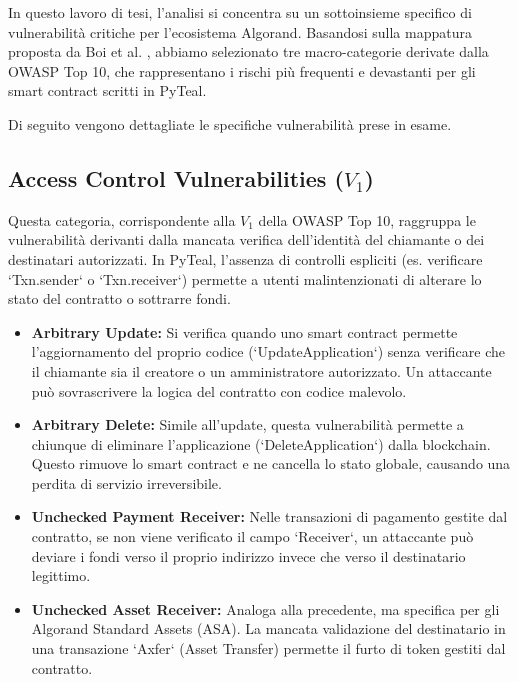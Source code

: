 In questo lavoro di tesi, l'analisi si concentra su un sottoinsieme specifico di vulnerabilità critiche per l'ecosistema Algorand. Basandosi sulla mappatura proposta da Boi et al. \cite{boi2025}, abbiamo selezionato tre macro-categorie derivate dalla OWASP Top 10, che rappresentano i rischi più frequenti e devastanti per gli smart contract scritti in PyTeal.

Di seguito vengono dettagliate le specifiche vulnerabilità prese in esame.

\subsection{Access Control Vulnerabilities (\texorpdfstring{$V_1$}{V1})}
Questa categoria, corrispondente alla $V_1$ \cite{boi2025} della OWASP Top 10, raggruppa le vulnerabilità derivanti dalla mancata verifica dell'identità del chiamante o dei destinatari autorizzati. In PyTeal, l'assenza di controlli espliciti (es. verificare `Txn.sender` o  `Txn.receiver`) permette a utenti malintenzionati di alterare lo stato del contratto o sottrarre fondi.

\begin{itemize}
    \item \textbf{Arbitrary Update:} Si verifica quando uno smart contract permette l'aggiornamento del proprio codice (`UpdateApplication`) senza verificare che il chiamante sia il creatore o un amministratore autorizzato. Un attaccante può sovrascrivere la logica del contratto con codice malevolo.
    
    \item \textbf{Arbitrary Delete:} Simile all'update, questa vulnerabilità permette a chiunque di eliminare l'applicazione (`DeleteApplication`) dalla blockchain. Questo rimuove lo smart contract e ne cancella lo stato globale, causando una perdita di servizio irreversibile.
    
    \cite{boi2025}\item \textbf{Unchecked Payment Receiver:} Nelle transazioni di pagamento gestite dal contratto, se non viene verificato il campo `Receiver`, un attaccante può deviare i fondi verso il proprio indirizzo invece che verso il destinatario legittimo.
    
    \item \textbf{Unchecked Asset Receiver:} Analoga alla precedente, ma specifica per gli Algorand Standard Assets (ASA). \cite{boi2025}La mancata validazione del destinatario in una transazione `Axfer` (Asset Transfer) permette il furto di token gestiti dal contratto.
\end{itemize}

